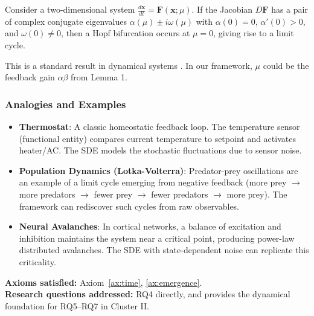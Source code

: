 \begin{theorem}
\label{thm:bifurcation}
Consider a two-dimensional system $\frac{d\mathbf{x}}{dt} = \mathbf{F}(\mathbf{x}; \mu)$. If the Jacobian $D\mathbf{F}$ has a pair of complex conjugate eigenvalues $\alpha(\mu) \pm i\omega(\mu)$ with $\alpha(0)=0$, $\alpha'(0) > 0$, and $\omega(0) \neq 0$, then a Hopf bifurcation occurs at $\mu=0$, giving rise to a limit cycle.
\end{theorem}
This is a standard result in dynamical systems \cite{kuznetsov2004elements}. In our framework, $\mu$ could be the feedback gain $\alpha\beta$ from Lemma 1.

\subsubsection{Analogies and Examples}
\begin{itemize}
    \item \textbf{Thermostat}: A classic homeostatic feedback loop. The temperature sensor (functional entity) compares current temperature to setpoint and activates heater/AC. The SDE models the stochastic fluctuations due to sensor noise.
    \item \textbf{Population Dynamics (Lotka-Volterra)}: Predator-prey oscillations are an example of a limit cycle emerging from negative feedback (more prey $\to$ more predators $\to$ fewer prey $\to$ fewer predators $\to$ more prey). The framework can rediscover such cycles from raw observables.
    \item \textbf{Neural Avalanches}: In cortical networks, a balance of excitation and inhibition maintains the system near a critical point, producing power-law distributed avalanches. The SDE with state-dependent noise can replicate this criticality.
\end{itemize}

\textbf{Axioms satisfied:} Axiom~\ref{ax:time}, \ref{ax:emergence}. \\
\textbf{Research questions addressed:} RQ4 directly, and provides the dynamical foundation for RQ5--RQ7 in Cluster II.

\endinput
